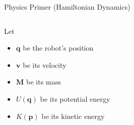 \documentclass{beamer}
\renewcommand{\vec}[1]{\ensuremath{\boldsymbol{\mathbf{#1}}}}
\newcommand{\mat}[1]{\ensuremath{\boldsymbol{\mathbf{#1}}}}
\begin{document}
    \begin{frame}{Physics Primer (Hamiltonian Dynamics)}
        \begin{columns}
            \begin{column}{.5\textwidth}
                \begin{definition}
                    Let
                    \small
                    \begin{itemize}
                        \item $\vec{q}$ be the robot's position
                        \item $\vec{v}$ be its velocity
                        \item $\mat{M}$ be its mass
                        \item $U\left(\vec{q}\right)$ be its potential energy
                        \item $K\left(\vec{p}\right)$ be its kinetic energy
                    \end{itemize}


\end{definition}
\end{column}
\end{columns}
\end{frame}
\end{document}
